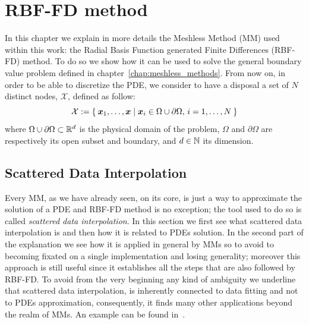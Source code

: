 \chapter{RBF-FD method}


In this chapter we explain in more details the Meshless Method (MM) used within this work: the Radial Basis Function generated Finite Differences (RBF-FD) method.
To do so we show how it can be used to solve the general boundary value problem defined in chapter~\vref{chap:meshless_methods}.
From now on, in order to be able to discretize the PDE, we consider to have a disposal a set of $N$ distinct nodes, $\mathcal{X}$, defined as follow:
\begin{equation}
\label{eqn:generic_set_of_nodes_X}
	\mathcal{X} := \Set{\boldsymbol{x}_1, \dots, \boldsymbol{x} \mid \boldsymbol{x}_i \in \Omega\cup\partial\Omega, \, i=1, \dots, N}
\end{equation}
where $\Omega\cup\partial\Omega \subset \mathbb{R}^d$ is the physical domain of the problem, $\Omega$ and $\partial\Omega$ are respectively its open subset and boundary, and $d \in \mathbb{N}$ its dimension.




\section{Scattered Data Interpolation}
\label{sec:scattered_data_interpolation}

Every MM, as we have already seen, on its core, is just a way to approximate the solution of a PDE and RBF-FD method is no exception; the tool used to do so is called \emph{scattered data interpolation}. In this section we first see what scattered data interpolation is and then how it is related to PDEs solution. In the second part of the explanation we see how it is applied in general by MMs so to avoid to becoming fixated on a single implementation and losing generality; moreover this approach is still useful since it establishes all the steps that are also followed by RBF-FD.
To avoid from the very beginning any kind of ambiguity we underline that scattered data interpolation, is inherently connected to data fitting and not to PDEs approximation, consequently, it finds many other applications beyond the realm of MMs. An example can be found in~\cite{Amidror:scattered_data_interpolation_in_image_processing}.

